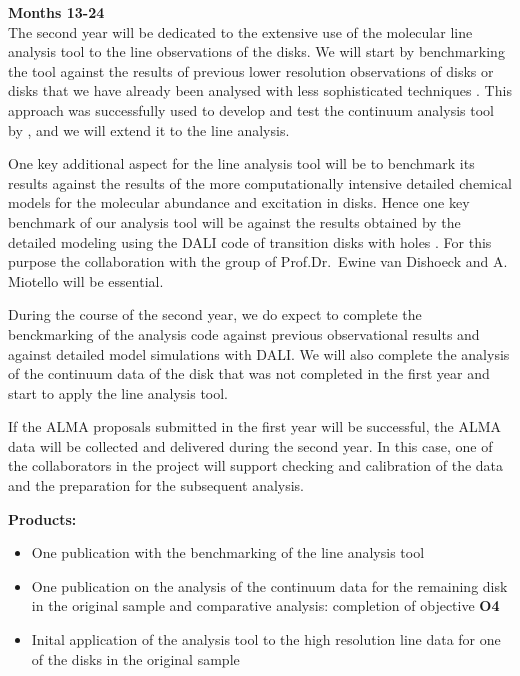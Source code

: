 \documentclass[10pt,fleqn,twoside]{article}
\begin{document}
{\Tcol\bf Months 13-24}\\
The second year will be dedicated to the extensive use of the molecular line analysis tool to
the line observations of the disks. We will start by benchmarking the tool against the results of previous lower resolution observations of disks or disks that we have already been analysed with less sophisticated techniques \citep[e.g.][]{Isella2016}. This approach was successfully used to develop and test the continuum analysis tool by \citet{2016A&A...588A..53T}, and we will extend it to the line analysis. 

One key additional aspect for the line analysis tool will be to benchmark its results against the results of the more computationally intensive detailed chemical models for the molecular abundance and excitation in disks. Hence one key benchmark of our analysis tool will be against the results obtained by the detailed modeling using the DALI code of transition disks with holes \citep{2016A&A...585A..58V}. For this purpose the collaboration with the group of Prof.Dr.~Ewine van Dishoeck and A. Miotello will be essential. 

During the course of the second year, we do expect to complete the benckmarking of the analysis code against previous observational results and against detailed model simulations with DALI. 
We will also complete the analysis of the continuum data of the disk that was not completed in the first year and start to apply the line analysis tool.

If the ALMA proposals submitted in the first year will be successful, the ALMA data will be collected and delivered during the second year. In this case, one of the collaborators in the project will support checking and calibration of the data and the preparation for the subsequent analysis. 

\smallskip
{\bf Products:} 
\begin{itemize}
\item One publication with the benchmarking of the line analysis tool
\item One publication on the analysis of the continuum data for the remaining disk in the original sample and comparative analysis: completion of objective {\bf O4}
\item Inital application of the analysis tool to the high resolution line data for one of the disks in the original sample
\end{itemize}
\end{document}
